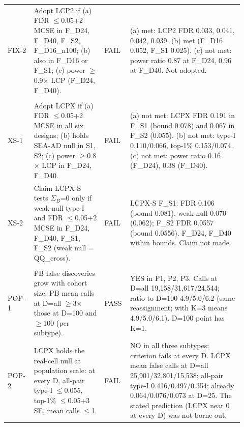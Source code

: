 \begin{table}[p]
\begin{tabular}{@{}>{\raggedright\arraybackslash}p{0.100\linewidth}>{\raggedright\arraybackslash}p{0.285\linewidth}>{\raggedright\arraybackslash}p{0.085\linewidth}>{\raggedright\arraybackslash}p{0.450\linewidth}@{}}
FIX-2 & Adopt LCP2 if (a) FDR $\le$0.05+2 MCSE in F\_D24, F\_D40, F\_S2, F\_D16\_n100; (b) also in F\_D16 or F\_S1; (c) power $\ge$0.9$\times$ LCP (F\_D24, F\_D40). & FAIL & (a) met: LCP2 FDR 0.033, 0.041, 0.042, 0.039. (b) met (F\_D16 0.052, F\_S1 0.025). (c) not met: power ratio 0.87 at F\_D24, 0.96 at F\_D40. Not adopted. \\
\addlinespace[3pt]
\multicolumn{4}{@{}>{\raggedright\arraybackslash}p{0.90\linewidth}}{\textbf{Plan 1b (XS\_PREREG: LCPX), with amendment 1}} \\
\cmidrule(lr){1-4}
XS-1 & Adopt LCPX if (a) FDR $\le$0.05+2 MCSE in all six designs; (b) holds SEA-AD null in S1, S2; (c) power $\ge$0.8$\times$ LCP in F\_D24, F\_D40. & FAIL & (a) not met: LCPX FDR 0.191 in F\_S1 (bound 0.078) and 0.067 in F\_S2 (0.055). (b) not met: type-I 0.110/0.066, top-1\% 0.153/0.074. (c) not met: power ratio 0.16 (F\_D24), 0.38 (F\_D40). \\
XS-2 & Claim LCPX-S tests $\Sigma_{B}$=0 only if weak-null type-I and FDR $\le$0.05+2 MCSE in F\_D24, F\_D40, F\_S1, F\_S2 (weak null = QQ\_cross). & FAIL & LCPX-S F\_S1: FDR 0.106 (bound 0.081), weak-null 0.070 (0.062); F\_S2 FDR 0.0557 (bound 0.0556). F\_D24, F\_D40 within bounds. Claim not made. \\
\addlinespace[3pt]
\multicolumn{4}{@{}>{\raggedright\arraybackslash}p{0.90\linewidth}}{\textbf{Plan 1c (POP\_PREREG: PsychAD population scale)}} \\
\cmidrule(lr){1-4}
POP-1 & PB false discoveries grow with cohort size: PB mean calls at D=all $\ge$3$\times$ those at D=100 and $\ge$100 (per subtype). & PASS & YES in P1, P2, P3. Calls at D=all 19,158/31,617/24,544; ratio to D=100 4.9/5.0/6.2 (same reassignment; with K=3 means 4.9/5.0/6.1). D=100 point has K=1. \\
POP-2 & LCPX holds the real-cell null at population scale: at every D, all-pair type-I $\le$0.055, top-1\% $\le$0.05+3 SE, mean calls $\le$1. & FAIL & NO in all three subtypes; criterion fails at every D. LCPX mean false calls at D=all 25,901/32,801/15,538; all-pair type-I 0.416/0.497/0.354; already 0.064/0.076/0.073 at D=25. The stated prediction (LCPX near 0 at every D) was not borne out. \\
\bottomrule
\end{tabular}
\end{table}

